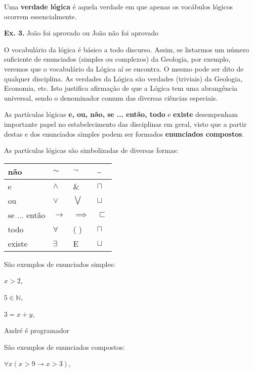 Uma \textbf{verdade lógica} é aquela verdade em que apenas os vocábulos lógicos ocorrem essencialmente.

\noindent \textbf{Ex. 3.} João foi aprovado ou João não foi aprovado

O vocabulário da lógica é básico a todo discurso.
Assim, se listarmos um número suficiente de enunciados (simples ou complexos) da Geologia, por exemplo, veremos que o vocabulário da Lógica aí se encontra.
O mesmo pode ser dito de qualquer disciplina.
As verdades da Lógica são verdades (triviais) da Geologia, Economia, etc.
Isto justifica afirmação de que a Lógica tem uma abrangência universal, sendo o denominador comum das diversas ciências especiais.

As partículas lógicas \textbf{e, ou, não, se ... então, todo} e \textbf{existe} desempenham importante papel no estabelecimento das disciplinas em geral, visto que a partir destas e dos enunciados simples podem ser formados \textbf{enunciados compostos}.

As partículas lógicas são simbolizadas de diversas formas:
\bigskip
\begin{center}
    \large
    \begin{tabular}{l l l l}
        não          & $\sim$   & $\neg$  & \textasciitilde \\ \hline
        e            & $\wedge$ & \& & $\sqcap$ \\ \hline
        ou           & $\vee$   & $\bigvee$  & $\sqcup$ \\ \hline
        se ... então & $\rightarrow$ & $\implies$ & $\sqsubset$  \\ \hline
        todo         & $\forall$  & \small( \small) & \LARGE{$\sqcap$} \\ \hline
        existe       & $\exists$ & E & \LARGE{$\sqcup$}  \\ \hline
    \end{tabular}
\end{center}

\bigskip \noindent
São exemplos de enunciados simples:

\hskip 2.6cm $x > 2$,

\hskip 2.5cm $5 \in \mathbb{N}$,

\hskip 2.5cm $ 3 = x + y$,

\hskip 2.5cm André é programador

\bigskip \noindent
São exemplos de enunciados compostos:

\hskip 2.5cm $\forall x(x > 9 \to x > 3)$,

